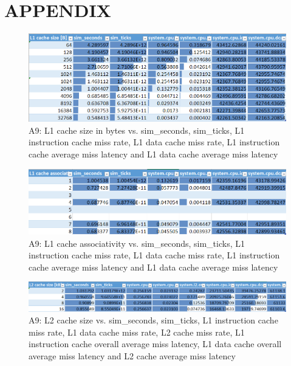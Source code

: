 \documentclass[a4paper, 10pt, conference]{ieeeconf}      %
\begin{document}
\newpage
\onecolumn
\section*{APPENDIX}

\begin{figure}[thpb]
\centering
\includegraphics[scale=0.7]{Figures/assignment1_1_table.png}
\caption{A9: L1 cache size in bytes vs. sim\_seconds, sim\_ticks, L1 instruction cache miss rate, L1 data cache miss rate, L1 instruction cache average miss latency and L1 data cache average miss latency}
\label{Afigure1_1}
\end{figure}

\begin{figure}[thpb]
\centering
\includegraphics[scale=0.7]{Figures/assignment1_2_table.png}
\caption{A9: L1 cache associativity vs. sim\_seconds, sim\_ticks, L1 instruction cache miss rate, L1 data cache miss rate, L1 instruction cache average miss latency and L1 data cache average miss latency}
\label{Afigure1_2}
\end{figure}

\begin{figure}[thpb]
\centering
\includegraphics[scale=0.572]{Figures/assignment1_3_table.png}
\caption{A9: L2 cache size vs. sim\_seconds, sim\_ticks, L1 instruction cache miss rate, L1 data cache miss rate, L2 cache miss rate, L1 instruction cache overall average miss latency, L1 data cache overall average miss latency and L2 cache average miss latency}
\label{Afigure1_3}
\end{figure}
\end{document}
